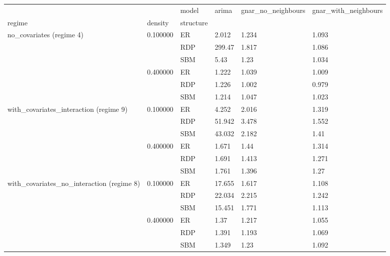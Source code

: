 \begin{tabular}{llllll}
\toprule
 &  & model & arima & gnar_no_neighbours & gnar_with_neighbours \\
regime & density & structure &  &  &  \\
\midrule
\multirow[t]{6}{*}{no_covariates (regime 4)} & \multirow[t]{3}{*}{0.100000} & ER & 2.012 & 1.234 & 1.093 \\
 &  & RDP & 299.47 & 1.817 & 1.086 \\
 &  & SBM & 5.43 & 1.23 & 1.034 \\
\cline{2-6}
 & \multirow[t]{3}{*}{0.400000} & ER & 1.222 & 1.039 & 1.009 \\
 &  & RDP & 1.226 & 1.002 & 0.979 \\
 &  & SBM & 1.214 & 1.047 & 1.023 \\
\cline{1-6} \cline{2-6}
\multirow[t]{6}{*}{with_covariates_interaction (regime 9)} & \multirow[t]{3}{*}{0.100000} & ER & 4.252 & 2.016 & 1.319 \\
 &  & RDP & 51.942 & 3.478 & 1.552 \\
 &  & SBM & 43.032 & 2.182 & 1.41 \\
\cline{2-6}
 & \multirow[t]{3}{*}{0.400000} & ER & 1.671 & 1.44 & 1.314 \\
 &  & RDP & 1.691 & 1.413 & 1.271 \\
 &  & SBM & 1.761 & 1.396 & 1.27 \\
\cline{1-6} \cline{2-6}
\multirow[t]{6}{*}{with_covariates_no_interaction (regime 8)} & \multirow[t]{3}{*}{0.100000} & ER & 17.655 & 1.617 & 1.108 \\
 &  & RDP & 22.034 & 2.215 & 1.242 \\
 &  & SBM & 15.451 & 1.771 & 1.113 \\
\cline{2-6}
 & \multirow[t]{3}{*}{0.400000} & ER & 1.37 & 1.217 & 1.055 \\
 &  & RDP & 1.391 & 1.193 & 1.069 \\
 &  & SBM & 1.349 & 1.23 & 1.092 \\
\cline{1-6} \cline{2-6}
\bottomrule
\end{tabular}
